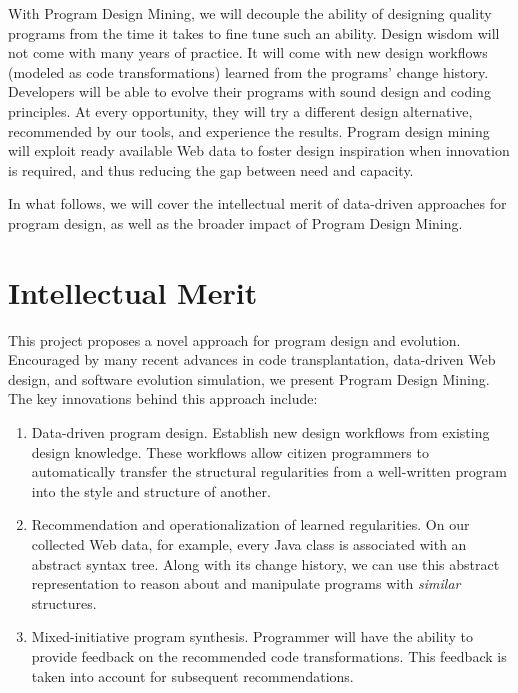 With Program Design Mining, we will decouple the ability of designing quality 
programs from the time it takes to fine tune such an ability. Design wisdom 
will not come with many years of practice. It will come with new design 
workflows (modeled as code transformations) learned from the programs' 
change history. Developers will be able to evolve their programs with 
sound design and coding principles. At every opportunity, they will try a 
different design alternative, recommended by our tools, and experience the 
results. Program design mining will exploit ready available Web data to 
foster design inspiration when innovation is required, and thus reducing 
the gap between need and capacity.

In what follows, we will cover the intellectual merit of data-driven 
approaches for program design, as well as the broader impact of Program 
Design Mining.

\section*{Intellectual Merit} %
\label{sec:merit}

This project proposes a novel approach for program design and 
evolution. Encouraged by many recent advances in code transplantation, 
data-driven Web design, and software evolution simulation, we 
present Program Design Mining. The key innovations behind this 
approach include:

\begin{enumerate}
	\item Data-driven program design. Establish new design workflows 
	from existing design knowledge. These workflows allow citizen 
	programmers to automatically transfer the structural regularities 
	from a well-written program into the style and structure of another.  
	\item Recommendation and operationalization of learned regularities. 
	On our collected Web data, for example, every Java class is associated 
	with an abstract syntax tree. Along with its change history, we can use 
	this abstract representation to reason about and manipulate programs 
	with \textit{similar} structures.
	\item Mixed-initiative program synthesis. Programmer will have the ability 
	to provide feedback on the recommended code transformations. This feedback 
	is taken into account for subsequent recommendations.
\end{enumerate}

